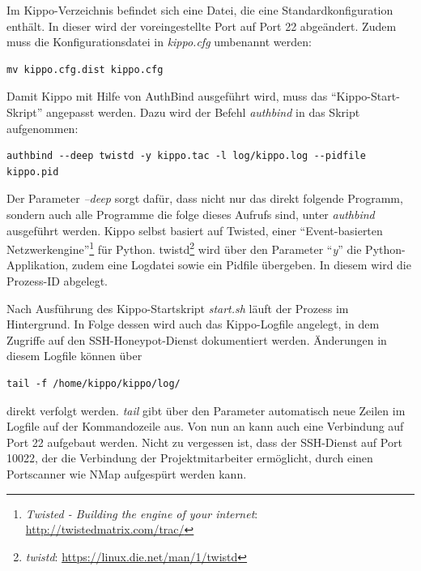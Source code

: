 Im Kippo-Verzeichnis befindet sich eine Datei, die eine Standardkonfiguration enthält. In dieser wird der  voreingestellte Port auf Port 22 abgeändert. Zudem muss die Konfigurationsdatei in \textit{kippo.cfg} umbenannt werden:

\begin{lstlisting}[style=customc]
mv kippo.cfg.dist kippo.cfg
\end{lstlisting}

Damit Kippo mit Hilfe von AuthBind ausgeführt wird, muss das "`Kippo-Start-Skript"' angepasst werden. Dazu wird der Befehl \textit{authbind} in das Skript aufgenommen:

\begin{lstlisting}[style=customc]
authbind --deep twistd -y kippo.tac -l log/kippo.log --pidfile kippo.pid
\end{lstlisting}

Der Parameter \textit{--deep} sorgt dafür, dass nicht nur das direkt folgende Programm, sondern auch alle Programme die folge dieses Aufrufs sind, unter \textit{authbind} ausgeführt werden. Kippo selbst basiert auf Twisted, einer "`Event-basierten Netzwerkengine"'\footnote{ \textit{Twisted - Building the engine of your internet}: \url{http://twistedmatrix.com/trac/}} für Python. twistd\footnote{ \textit{twistd}: \url{https://linux.die.net/man/1/twistd}} wird über den Parameter "`\textit{y}"' die Python-Applikation, zudem eine Logdatei sowie ein Pidfile übergeben. In diesem wird die Prozess-ID abgelegt.

Nach Ausführung des Kippo-Startskript \textit{start.sh} läuft der Prozess im Hintergrund. In Folge dessen wird auch das Kippo-Logfile angelegt, in dem Zugriffe auf den SSH-Honeypot-Dienst dokumentiert werden. Änderungen in diesem Logfile können über

\begin{lstlisting}[style=customc]
tail -f /home/kippo/kippo/log/
\end{lstlisting}

direkt verfolgt werden. \textit{tail} gibt über den Parameter automatisch neue Zeilen im Logfile auf der Kommandozeile aus. Von nun an kann auch eine Verbindung auf Port 22 aufgebaut werden. Nicht zu vergessen ist, dass der SSH-Dienst auf Port 10022, der die Verbindung der Projektmitarbeiter ermöglicht, durch einen Portscanner wie NMap aufgespürt werden kann.

